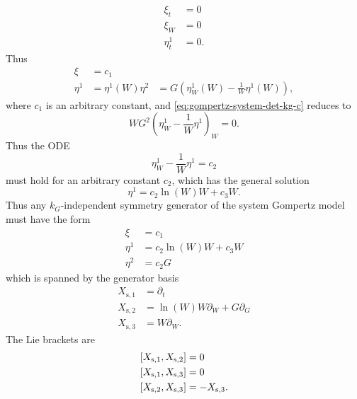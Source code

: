 \begin{align}
  \xi_t &= 0\\
  \xi_W &= 0\\
  \eta^1_t &= 0.
\end{align}
Thus
\begin{align}
  \xi &= c_1\\
  \eta^1 &= \eta^1(W)
  \eta^2 &= G \left(\eta^1_W(W) - \frac{1}{W} \eta^1(W) \right),
\end{align}
where \(c_1\) is an arbitrary constant, and \cref{eq:gompertz-system-det-kg-c} reduces to
\begin{equation}
  W G^2 \left(\eta^1_W - \frac{1}{W} \eta^1 \right)_W = 0.
\end{equation}
Thus the ODE
\begin{equation}
  \eta^1_W - \frac{1}{W} \eta^1 = c_2
\end{equation}
must hold for an arbitrary constant \(c_2\), which has the general solution
\begin{equation}
  \eta^1 = c_2 \ln(W) W + c_3 W.
\end{equation}
Thus any \(k_G\)-independent symmetry generator of the system Gompertz model  must have the form
\begin{align}
  \xi &= c_1 \\
  \eta^1 &= c_2 \ln(W) W + c_3 W\\
  \eta^2 &= c_2 G
\end{align}
which is spanned by the generator basis
\begin{align}
  X_{\text{s},1} &= \partial_t \\
  X_{\text{s},2} &= \ln(W) W \partial_W + G \partial_G \\
  X_{\text{s},3} &= W \partial_W.
\end{align}
The Lie brackets are
\begin{align}
  \comm{X_{\text{s},1}}{X_{\text{s},2}} &= 0 \\
  \comm{X_{\text{s},1}}{X_{\text{s},3}} &= 0 \\
  \comm{X_{\text{s},2}}{X_{\text{s},3}} &= -X_{\text{s},3}.
\end{align}
